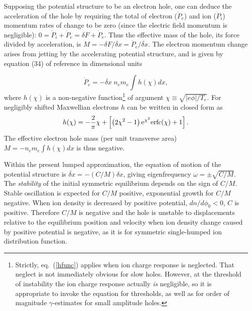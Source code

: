 \documentclass[pre]{revtex4-2}
\begin{document}
Supposing the potential structure to be an electron hole, one can
deduce the acceleration of the hole by requiring the total of electron
($\dot P_e$) and ion ($\dot P_i$) momentum rates of change to be zero
(since the electric field momentum is negligible):
$0=\dot P_i+\dot P_e=\delta F +\dot P_e$. Thus the effective mass of
the hole, its force divided by acceleration, is
$M=-\delta F/\ddot{\delta x}=\dot P_e/\ddot{\delta x}$. The electron
momentum change arises from jetting by the accelerating potential
structure, and is given by equation (34) of reference \cite{Hutchinson2016}
in dimensional units

\begin{equation}
  \dot P_e = - \ddot{\delta x}\;n_e m_e\int h(\chi) dx ,
\end{equation}
where $h(\chi)$ is a non-negative function\footnote{Strictly, eq.\
  (\ref{hfunc}) applies when ion charge response is neglected. That
  neglect is not immediately obvious for slow holes. However, at the
  threshold of instability the ion charge response actually \emph{is}
  negligible, so it is appropriate to invoke the equation for
  thresholds, as well as for order of magnitude $\gamma$-estimates for
  small amplitude holes.} of argument
$\chi\equiv\sqrt{|e\phi|/T_e}$. For negligibly shifted Maxwellian
electrons $h$ can be written in closed form as
\begin{equation}\label{hfunc}
  h(\chi)=-{2\over \pi}\chi +\left[\left(2\chi^2-1\right){\rm e}^{\chi^2}{\rm
      erfc}(\chi)+1  \right].
\end{equation}
The effective electron hole mass (per unit transverse area)
$M=- n_em_e \int h(\chi) dx$ is thus negative.

Within the present lumped approximation, the equation of motion of the
potential structure is $\ddot{\delta x}=-(C/M)\delta x$, giving
eigenfrequency $\omega =\pm\sqrt{C/M}$. The \emph{stability} of the
initial symmetric equilibrium depends on the sign of $C/M$.  Stable
oscillation is expected for $C/M$ positive, exponential growth for
$C/M$ negative.  When ion density is decreased by positive
potential, $dn/d\phi_0<0$, $C$ is positive.  Therefore $C/M$ is negative
and the hole is unstable to displacements relative to the equilibrium
position and velocity when ion density change caused by positive
potential is negative, as it is for symmetric single-humped ion
distribution function.
\end{document}
